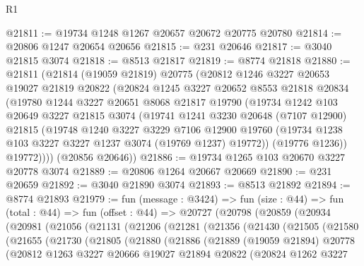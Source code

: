 \begin{lexlean}{R1}
\begin{coremodule}
@21811 := @19734 @1248 @1267 @20657 @20672 @20775 @20780
@21814 := @20806 @1247 @20654 @20656
@21815 := @231 @20646
@21817 := @3040 @21815 @3074
@21818 := @8513 @21817
@21819 := @8774 @21818
@21880 := @21811
    (@21814
      (@19059 @21819)
      @20775
      (@20812
        @1246
        @3227
        @20653
        @19027
        @21819
        @20822
        (@20824
          @1245
          @3227
          @20652
          @8553
          @21818
          @20834
          (@19780
            @1244
            @3227
            @20651
            @8068
            @21817
            @19790
            (@19734
              @1242
              @103
              @20649
              @3227
              @21815
              @3074
              (@19741
                @1241
                @3230
                @20648
                (@7107 @12900)
                @21815
                (@19748
                  @1240
                  @3227
                  @3229
                  @7106
                  @12900
                  @19760
                  (@19734 @1238 @103 @3227 @3227 @1237 @3074 (@19769 @1237) @19772))
                (@19776 @1236))
              @19772))))
      (@20856 @20646))
@21886 := @19734 @1265 @103 @20670 @3227 @20778 @3074
@21889 := @20806 @1264 @20667 @20669
@21890 := @231 @20659
@21892 := @3040 @21890 @3074
@21893 := @8513 @21892
@21894 := @8774 @21893
@21979 := fun (message : @3424) =>
  fun (size : @44) =>
  fun (total : @44) =>
  fun (offset : @44) =>
  @20727
    (@20798
      (@20859
        (@20934
          (@20981
            (@21056
              (@21131
                (@21206
                  (@21281
                    (@21356
                      (@21430
                        (@21505
                          (@21580
                            (@21655
                              (@21730
                                (@21805
                                  (@21880
                                    (@21886
                                      (@21889
                                        (@19059 @21894)
                                        @20778
                                        (@20812
                                          @1263
                                          @3227
                                          @20666
                                          @19027
                                          @21894
                                          @20822
                                          (@20824
                                            @1262
                                            @3227

\end{coremodule}
\end{lexlean}
